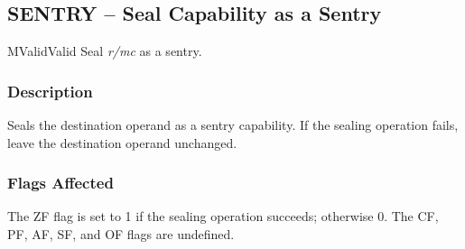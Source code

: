 \clearpage
{}
{}
\subsection*{SENTRY -- Seal Capability as a Sentry}

\begin{x86opcodetable}
  {M}{Valid}{Valid}
  {Seal \emph{r/mc} as a sentry.}
\end{x86opcodetable}

\begin{x86opentable}
\end{x86opentable}

\subsubsection*{Description}

Seals the destination operand as a sentry capability.  If the sealing
operation fails, leave the destination operand unchanged.

\subsubsection*{Flags Affected}

The ZF flag is set to 1 if the sealing operation succeeds; otherwise
0.  The CF, PF, AF, SF, and OF flags are undefined.
